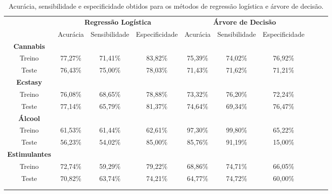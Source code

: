 \begin{table}[H]
\centering
\addtolength{\leftskip}{-2.0cm}
\begin{tabular}{cccccccccc}
\hline
 & \multicolumn{3}{c}{\textbf{Regressão Logística}} & \multicolumn{3}{c}{\textbf{Árvore de Decisão}} &  &  &  \\
 & Acurácia & Sensibilidade & Especificidade & Acurácia & Sensibilidade & Especificidade &  &  &  \\ \hline
\textbf{Cannabis} &  &  &  &  &  &  &  &  &  \\
Treino & 77,27\% & 71,41\% & 83,82\% & 75,39\% & 74,02\% & 76,92\%  & & &  \\
Teste &  76,43\% &  75,00\% &  78,03\% &  71,43\% &  71,62\%&  71,21\%&  &  &  \\ \hline
\textbf{Ecstasy} &  &  &  &  &  &  &  &  &  \\
Treino & 76,08\% & 68,65\% & 78,88\% & 73,32\% & 76,20\% & 72,24\%  &  &  &  \\
Teste &  77,14\% & 65,79\% & 81,37\% & 74,64\% & 69,34\% & 76,47\% &  &  &  \\ \hline
\textbf{Álcool} &  &  &  &  &  &  &  &  &  \\
Treino & 61,53\% & 61,44\% & 62,61\% & 97,30\% & 99,80\% & 65,22\% &  &  &  \\
Teste & 56,23\% & 54,02\% & 85,00\% & 85,76\% & 91,19\% & 15,00\% &  &  &  \\ \hline
\textbf{Estimulantes} &  &  &  &  &  &  &  &  &  \\
Treino & 72,74\% & 59,29\% & 79,22\% & 68,86\%& 74,71\% & 66,05\% &  &  &  \\
Teste & 70,82\% & 63,74\% & 74,21\% & 64,77\% & 74,72\% & 60,00\% &  &  &  \\ \hline
 &  &  &  &  &  &  &  &  &  \\
 &  &  &  &  &  &  &  &  & 
\end{tabular}
\caption{Acurácia, sensibilidade e especificidade obtidos para os métodos de regressão logística e árvore de decisão.}
\label{tabela_resultados}
\end{table}